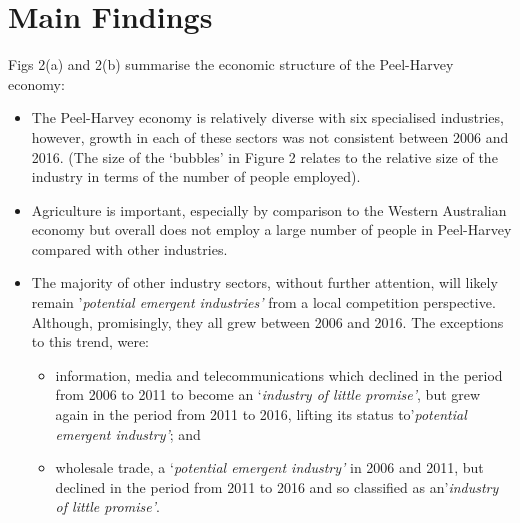 \documentclass[
]{book}
\begin{document}
\hypertarget{main-findings-5}{%
\section{Main Findings}\label{main-findings-5}}

Figs 2(a) and 2(b) summarise the economic structure of the Peel-Harvey economy:

\begin{itemize}
\item
  The Peel-Harvey economy is relatively diverse with six specialised industries, however, growth in each of these sectors was not consistent between 2006 and 2016. (The size of the `bubbles' in Figure 2 relates to the relative size of the industry in terms of the number of people employed).
\item
  Agriculture is important, especially by comparison to the Western Australian economy but overall does not employ a large number of people in Peel-Harvey compared with other industries.~
\item
  The majority of other industry sectors, without further attention, will likely remain '\emph{potential emergent industries'} from a local competition perspective. Although, promisingly, they all grew between 2006 and 2016. The exceptions to this trend, were:

  \begin{itemize}
  \item
    information, media and telecommunications which declined in the period from 2006 to 2011 to become an `\emph{industry of little promise'}, but grew again in the period from 2011 to 2016, lifting its status to'\emph{potential emergent industry'}; and
  \item
    wholesale trade, a `\emph{potential emergent industry'} in 2006 and 2011, but declined in the period from 2011 to 2016 and so classified as an'\emph{industry of little promise'}.~
  \end{itemize}
\end{itemize}
\end{document}
